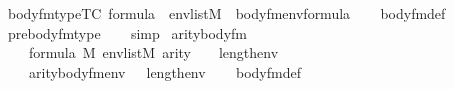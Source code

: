 \begin{isabellebody}
\isanewline
{}\isamarkupfalse%
\ body{\isacharunderscore}{\kern0pt}fm{\isacharprime}{\kern0pt}{\isacharunderscore}{\kern0pt}type{\isacharbrackleft}{\kern0pt}TC{\isacharbrackright}{\kern0pt}{\isacharcolon}{\kern0pt}\ {\isachardoublequoteopen}{\isasymphi}{\isasymin}formula\ {\isasymLongrightarrow}\ env{\isasymin}list{\isacharparenleft}{\kern0pt}M{\isacharparenright}{\kern0pt}\ {\isasymLongrightarrow}\ body{\isacharunderscore}{\kern0pt}fm{\isacharprime}{\kern0pt}{\isacharparenleft}{\kern0pt}{\isasymphi}{\isacharcomma}{\kern0pt}env{\isacharparenright}{\kern0pt}{\isasymin}formula{\isachardoublequoteclose}\isanewline
%
\isadelimproof
\ \ %
\endisadelimproof
%
\isatagproof
{}\isamarkupfalse%
\ body{\isacharunderscore}{\kern0pt}fm{\isacharprime}{\kern0pt}{\isacharunderscore}{\kern0pt}def\ \isamarkupfalse%
\ prebody{\isacharunderscore}{\kern0pt}fm{\isacharunderscore}{\kern0pt}type\isanewline
\ \ \isamarkupfalse%
\ simp%
\endisatagproof
{\isafoldproof}%
%
\isadelimproof
\isanewline
%
\endisadelimproof
\isanewline
{}\isamarkupfalse%
\ arity{\isacharunderscore}{\kern0pt}body{\isacharunderscore}{\kern0pt}fm{\isacharprime}{\kern0pt}{\isacharcolon}{\kern0pt}\isanewline
\ \ \isanewline
\ \ \ \ {\isachardoublequoteopen}{\isasymphi}{\isasymin}formula{\isachardoublequoteclose}\ {\isachardoublequoteopen}{\isasymalpha}{\isasymin}M{\isachardoublequoteclose}\ {\isachardoublequoteopen}env{\isasymin}list{\isacharparenleft}{\kern0pt}M{\isacharparenright}{\kern0pt}{\isachardoublequoteclose}\ {\isachardoublequoteopen}arity{\isacharparenleft}{\kern0pt}{\isasymphi}{\isacharparenright}{\kern0pt}\ {\isasymle}\ {}\ {\isacharhash}{\kern0pt}{\isacharplus}{\kern0pt}\ length{\isacharparenleft}{\kern0pt}env{\isacharparenright}{\kern0pt}{\isachardoublequoteclose}\isanewline
\ \ \isanewline
\ \ \ \ {\isachardoublequoteopen}arity{\isacharparenleft}{\kern0pt}body{\isacharunderscore}{\kern0pt}fm{\isacharprime}{\kern0pt}{\isacharparenleft}{\kern0pt}{\isasymphi}{\isacharcomma}{\kern0pt}env{\isacharparenright}{\kern0pt}{\isacharparenright}{\kern0pt}{\isasymle}{}\ \ {\isacharhash}{\kern0pt}{\isacharplus}{\kern0pt}\ length{\isacharparenleft}{\kern0pt}env{\isacharparenright}{\kern0pt}{\isachardoublequoteclose}\isanewline
%
\isadelimproof
\ \ %
\endisadelimproof
%
\isatagproof
{}\isamarkupfalse%
\ body{\isacharunderscore}{\kern0pt}fm{\isacharprime}{\kern0pt}{\isacharunderscore}{\kern0pt}def\isanewline
\ \ \isamarkupfalse%

\end{isabellebody}
